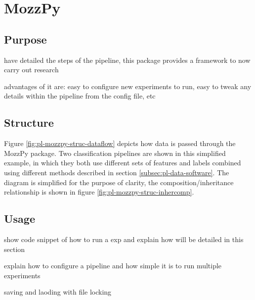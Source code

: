 \section{MozzPy}
\label{sec:pl-mozzpy}
    
    \subsection{Purpose}
    \label{subsec:pl-mozzpy-purp}
        \begin{sitemize}
            \item{have detailed the steps of the pipeline, this package provides a framework to now carry out research}
            \item{advantages of it are: easy to configure new experiments to run, easy to tweak any details within the pipeline from the config file, etc}
        \end{sitemize}
    
    \subsection{Structure}
    \label{subsec:pl-mozzpy-struc}
        
        
        Figure \ref{fig:pl-mozzpy-struc-dataflow} depicts how data is passed through the MozzPy package. Two classification pipelines are shown in this simplified example, in which they both use different sets of features and labels combined using different methods described in section \ref{subsec:pl-data-software}. The diagram is simplified for the purpose of clarity, the composition/inheritance relationship is shown in figure \ref{fig:pl-mozzpy-struc-inhercomp}.
        
        
        
  
    
    \subsection{Usage}
    \label{subsec:pl-mozzpy-usage}
        \begin{sitemize}
            \item{show code snippet of how to run a exp and explain how will be detailed in this section}
            \item{explain how to configure a pipeline and how simple it is to run multiple experiments}
            \item{saving and laoding with file locking}
        \end{sitemize}
   
